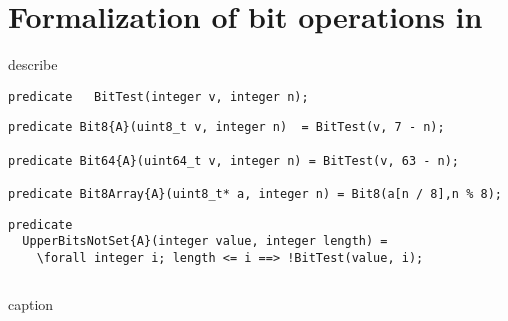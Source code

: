 \FloatBarrier

\section{Formalization of bit operations in \framac}





describe 





\begin{lstlisting}[style=acsl-block]
predicate   BitTest(integer v, integer n);
\end{lstlisting}






\begin{lstlisting}[style=acsl-block]
predicate Bit8{A}(uint8_t v, integer n)  = BitTest(v, 7 - n);

predicate Bit64{A}(uint64_t v, integer n) = BitTest(v, 63 - n);

predicate Bit8Array{A}(uint8_t* a, integer n) = Bit8(a[n / 8],n % 8);
\end{lstlisting}










\begin{lstlisting}[style=acsl-block]
predicate
  UpperBitsNotSet{A}(integer value, integer length) =
    \forall integer i; length <= i ==> !BitTest(value, i);
\end{lstlisting}











\begin{listing}[hbt]
\begin{minipage}{0.99\textwidth}
\begin{lstlisting}[style=acsl-block]

\end{lstlisting}
\end{minipage}
\caption{caption}
\end{listing}

